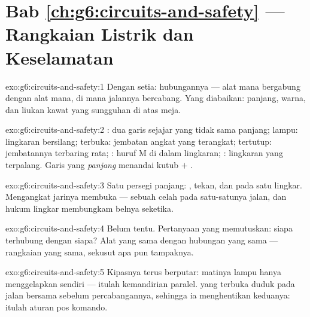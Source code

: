 \section*{Bab \ref{ch:g6:circuits-and-safety} --- Rangkaian Listrik dan Keselamatan}

\begin{solution}{exo:g6:circuits-and-safety:1}
Dengan setia: hubungannya --- alat mana bergabung dengan alat mana, di
mana jalannya bercabang. Yang diabaikan: panjang, warna, dan liukan
kawat yang sungguhan di atas meja.
\end{solution}

\begin{solution}{exo:g6:circuits-and-safety:2}
: dua garis sejajar yang tidak sama panjang; lampu: lingkaran
bersilang;  terbuka: jembatan angkat yang terangkat; 
tertutup: jembatannya terbaring rata; : huruf M di dalam
lingkaran; : lingkaran yang terpalang. Garis yang
\emph{panjang} menandai kutub $+$ .
\end{solution}

\begin{solution}{exo:g6:circuits-and-safety:3}
Satu persegi panjang: ,  tekan, dan  pada
satu lingkar. Mengangkat jarinya membuka  --- sebuah celah
pada satu-satunya jalan, dan hukum lingkar membungkam belnya seketika.
\end{solution}

\begin{solution}{exo:g6:circuits-and-safety:4}
Belum tentu. Pertanyaan yang memutuskan: siapa terhubung dengan siapa?
Alat yang sama dengan hubungan yang sama --- rangkaian yang sama,
sekusut apa pun tampaknya.
\end{solution}

\begin{solution}{exo:g6:circuits-and-safety:5}
Kipasnya terus berputar: matinya lampu hanya menggelapkan 
sendiri --- itulah kemandirian paralel.  yang terbuka duduk
pada jalan bersama sebelum percabangannya, sehingga ia menghentikan
keduanya: itulah aturan pos komando.
\end{solution}

